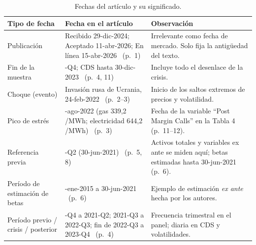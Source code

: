 \documentclass{article} %
\newcommand{\pg}[1]{(p.~#1)}
\newcommand{\eur}{\texteuro}
\begin{document}
    \begin{table}[h]
        \centering\small
        \begin{tabularx}{\textwidth}{>{\raggedright\arraybackslash}p{3.3cm}>{\raggedright\arraybackslash}p{3.3cm}X}
            \toprule
                \textbf{Tipo de fecha} & \textbf{Fecha en el artículo} & \textbf{Observación} \\
            \midrule
                Publicación & Recibido 29-dic-2024; Aceptado 11-abr-2026; En línea 15-abr-2026 \ \pg{1} & Irrelevante como fecha de mercado. Solo fija la antigüedad del texto. \\
                Fin de la muestra & 2023-Q4; CDS hasta 30-dic-2023 \ \pg{4, 11} & Incluye todo el desenlace de la crisis. \\
                Choque (evento) & Invasión rusa de Ucrania, 24-feb-2022 \ \pg{2--3} & Inicio de los saltos extremos de precios y volatilidad. \\
                Pico de estrés & 26-ago-2022 (gas 339,2 \eur/MWh; electricidad 644,2 \eur/MWh) \ \pg{3} & Fecha de la variable ``Post Margin Calls'' en la Tabla 4 \pg{11--12}. \\
                Referencia previa & 2021-Q2 (30-jun-2021) \ \pg{5, 8} & Activos totales y variables ex ante se miden aquí; betas estimadas hasta 30-jun-2021 \pg{6}. \\
                Período de estimación de betas & 1-ene-2015 a 30-jun-2021 \ \pg{6} & Ejemplo de estimación \emph{ex ante} hecha por los autores. \\
                Período previo / crisis / posterior & 2020-Q4 a 2021-Q2; 2021-Q3 a 2022-Q3; fin de 2022-Q3 a 2023-Q4 \ \pg{4} & Frecuencia trimestral en el panel; diaria en CDS y volatilidades. \\
            \bottomrule
        \end{tabularx}
        \caption{Fechas del artículo y su significado.}
    \end{table}
\end{document}
